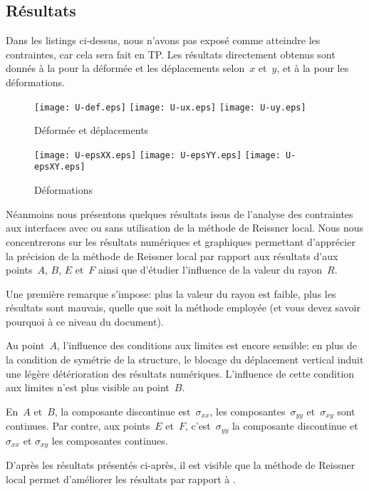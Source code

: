 \medskip
\subsection{Résultats}

Dans les listings ci-dessus, nous n'avons pas exposé comme atteindre les contraintes, car cela sera fait en TP.
Les résultats directement obtenus sont donnés à la  pour la déformée et les déplacements selon~$x$ et~$y$, et à la  pour les déformations.
\begin{figure}[h!]
  \texttt{[image: U-def.eps]} \hfill
  \texttt{[image: U-ux.eps]}\hfill
  \texttt{[image: U-uy.eps]}
  \caption{\label{Fig-poutU-disp} Déformée et déplacements}
\end{figure}
\begin{figure}[h!]
  \texttt{[image: U-epsXX.eps]} \hfill
  \texttt{[image: U-epsYY.eps]}\hfill
  \texttt{[image: U-epsXY.eps]}
  \caption{\label{Fig-poutU-eps} Déformations}\label{VMtiti}
\end{figure}

\medskip
Néanmoins nous présentons quelques résultats issus de l'analyse des contraintes aux interfaces avec ou sans utilisation de la méthode de Reissner local. Nous nous concentrerons sur les résultats numériques et graphiques permettant d'apprécier la précision de la méthode de Reissner local par rapport aux résultats d'\ansys aux points~$A$, $B$, $E$ et~$F$ ainsi que d'étudier l'influence de la valeur du rayon~$R$.

\medskip
Une première remarque s'impose: plus la valeur du rayon est faible, plus les résultats sont mauvais, quelle que soit la méthode employée (et vous devez savoir pourquoi à ce niveau du document).

\medskip
Au point~$A$, l'influence des conditions aux limites est encore sensible: en plus de la condition de symétrie de la structure, le blocage du déplacement vertical induit une légère détérioration des résultats numériques. L'influence de cette condition aux limites n'est plus visible au point~$B$.

\medskip
En~$A$ et~$B$, la composante discontinue est~$\sigma_{xx}$, les composantes~$\sigma_{yy}$ et~$\sigma_{xy}$ sont continues. Par contre, aux points~$E$ et~$F$, c'est~$\sigma_{yy}$ la composante discontinue et~$\sigma_{xx}$ et $\sigma_{xy}$ les composantes continues.

\medskip
D'après les résultats présentés ci-après, il est visible que la méthode de Reissner local permet d'améliorer les résultats par rapport à \ansys.



